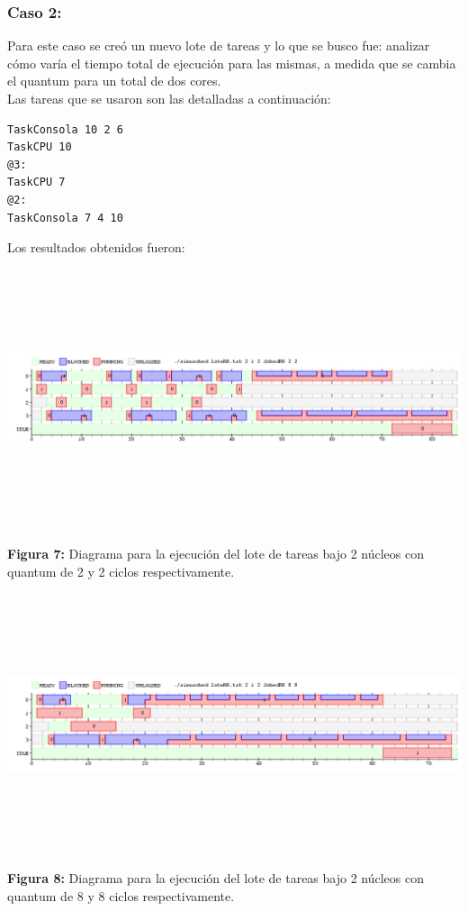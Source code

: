 \documentclass[a4paper]{article}
\begin{document}
 \subsubsection{Caso 2:}
 
 Para este caso se cre\'o un nuevo lote de tareas y lo que se busco fue: analizar c\'omo varía el tiempo total de ejecución para las mismas, a medida que se cambia el quantum para un total de dos cores.\\
 
 Las tareas que se usaron son las detalladas a continuaci\'on:\\
 \begin{codesnippet}
	\begin{verbatim}
TaskConsola 10 2 6
TaskCPU 10
@3:
TaskCPU 7
@2:
TaskConsola 7 4 10
	\end{verbatim}
	\end{codesnippet}

Los resultados obtenidos fueron:

 \includegraphics[width=\textwidth,height=3.0in,keepaspectratio]{imagenes/ej4/eje1.png} \\
\begin {flushleft}
\textbf{Figura 7:} Diagrama para la ejecuci\'on del lote de tareas bajo 2 n\'ucleos con quantum de 2 y 2 ciclos respectivamente.
\end{flushleft}

 \includegraphics[width=\textwidth,height=3.0in,keepaspectratio]{imagenes/ej4/eje2.png} \\
\begin {flushleft}
\textbf{Figura 8:} Diagrama para la ejecuci\'on del lote de tareas bajo 2 n\'ucleos con quantum de 8 y 8 ciclos respectivamente.
\end{flushleft}
\end{document}
